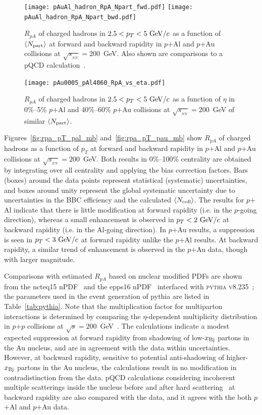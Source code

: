 \documentclass[twocolumn,letterpaper,aps,prc,longbibliography,superscriptaddress,nofootinbib,floatfix]{revtex4-2}
\newcommand{\pt}{\mbox{$p_T$}\xspace}
\newcommand{\rpa}{\mbox{$R_{pA}$}\xspace}
\newcommand{\npart}{\mbox{$\langle N_{\rm part} \rangle$}\xspace}
\newcommand{\ncoll}{\mbox{$\langle N_{\rm coll} \rangle$}\xspace}
\newcommand{\sqstwo}{\mbox{$\sqrt{s}=200$~GeV}\xspace}
\newcommand{\sqsntwo}{\mbox{$\sqrt{s_{_{NN}}}=200$~GeV}\xspace}
\newcommand{\pp}{\mbox{$p$+$p$}\xspace}
\newcommand{\pau}{\mbox{$p$$+$Au}\xspace}
\newcommand{\pal}{\mbox{$p$$+$Al}\xspace}
\newcommand{\pythia}{\mbox{{\sc pythia}}\xspace}
\newcommand{\ncteq}{\mbox{n{\sc cteq15}}\xspace}
\newcommand{\epps}{\mbox{{\sc epps16}}\xspace}
\newcommand{\xbj}{\mbox{$x_{\rm Bj}$}\xspace}
\begin{document}
\begin{figure}[tbh]
\texttt{[image: pAuAl\_hadron\_RpA\_Npart\_fwd.pdf]}
\texttt{[image: pAuAl\_hadron\_RpA\_Npart\_bwd.pdf]}
\caption{\label{fig:rpa_npart}
\rpa of charged hadrons in $2.5<p_T<5~{\rm GeV}/c$ as a function of 
\npart at forward and backward rapidity in \pal and \pau collisions at 
\sqsntwo. Also shown are comparisons to a pQCD 
calculation~\cite{Kang:2014hha}.}
\end{figure}

\begin{figure}[tbh]
\texttt{[image: pAu0005\_pAl4060\_RpA\_vs\_eta.pdf]}
\caption{\label{fig:rpa_eta_simnpart}
\rpa of charged hadrons in $2.5<p_T<5~{\rm GeV}/c$ as a function of 
$\eta$ in 0\%--5\% \pal and 40\%--60\% \pau collisions at \sqsntwo of 
similar \npart.}
\end{figure}

Figures~\ref{fig:rpa_pT_pal_mb} and~\ref{fig:rpa_pT_pau_mb} show \rpa of 
charged hadrons as a function of \pt at forward and backward rapidity in 
\pal and \pau collisions at \sqsntwo.  Both results in 0\%--100\% 
centrality are obtained by integrating over all centrality and applying 
the bias correction factors.  Bars (boxes) around the data points 
represent statistical (systematic) uncertainties, and boxes around unity 
represent the global systematic uncertainty due to uncertainties in the 
BBC efficiency and the calculated \ncoll. The results for \pal indicate 
that there is little modification at forward rapidity (i.e. in the 
$p$-going direction), whereas a small enhancement is observed in 
$\pt<2~{\rm GeV}/c$ at backward rapidity (i.e. in the Al-going 
direction). In \pau results, a suppression is seen in 
$\pt<3~{\rm GeV}/c$ at forward rapidity unlike the \pal results. At 
backward rapidity, a similar trend of enhancement is observed in the 
\pau data, though with larger magnitude.

Comparisons with estimated \rpa based on nuclear modified PDFs are shown 
from the \ncteq nPDF~\cite{Kovarik:2015cma} and the \epps 
nPDF~\cite{Eskola:2016oht} interfaced with \textsc{pythia 
v8.235}~\cite{Sjostrand:2014zea}; the parameters used in the event 
generation of \pythia are listed in Table~\ref{tab:pythia}. Note that 
the multiplication factor for multiparton interactions is determined by 
comparing the $\eta$-dependent multiplicity distribution in \pp 
collisions at \sqstwo~\cite{Alver:2010ck}. The calculations indicate a 
modest expected suppression at forward rapidity from shadowing of 
low-\xbj partons in the Au nucleus, and are in agreement with the data 
within uncertainties.  However, at backward rapidity, sensitive to 
potential anti-shadowing of higher-\xbj partons in the Au nucleus, the 
calculations result in no modification in contradistinction from the 
data. pQCD calculations considering incoherent multiple scatterings 
inside the nucleus before and after hard scattering~\cite{Kang:2014hha} 
at backward rapidity are also compared with the data, and it agrees with 
the both \pal and \pau data.
\end{document}
